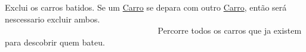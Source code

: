 Exclui os carros batidos. Se um \mbox{\hyperlink{class_carro}{Carro}} se depara com outro \mbox{\hyperlink{class_carro}{Carro}}, então será nescessario excluir ambos. ~\newline
~\newline
~\newline
~\newline
~\newline
~\newline
~\newline
~\newline
~\newline
~\newline
~\newline
~\newline
~\newline
~\newline
~\newline
~\newline
~\newline
~\newline
~\newline
~\newline
~\newline
~\newline
~\newline
~\newline
~\newline
~\newline
~\newline
~\newline
~\newline
~\newline
~\newline
~\newline
~\newline
~\newline
~\newline
~\newline
~\newline
~\newline
~\newline
~\newline
~\newline
~\newline
~\newline
~\newline
~\newline
~\newline
~\newline
~\newline
~\newline
~\newline
~\newline
 Percorre todos os carros que ja existem para descobrir quem bateu.

